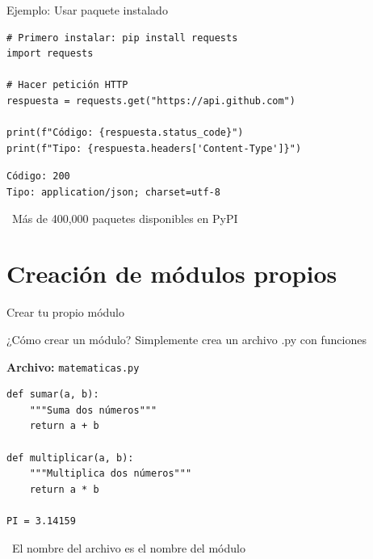 \documentclass{beamer}
\begin{document}
\begin{frame}[fragile]{Ejemplo: Usar paquete instalado \faRocket}
\begin{lstlisting}
# Primero instalar: pip install requests
import requests

# Hacer petición HTTP
respuesta = requests.get("https://api.github.com")

print(f"Código: {respuesta.status_code}")
print(f"Tipo: {respuesta.headers['Content-Type']}")
\end{lstlisting}

\vspace{-0.2cm}
\begin{tcolorbox}[colback=green!10,colframe=green,title={\small\faArrowCircleRight \ Salida},coltitle=fg0,left=3pt,right=3pt,top=2pt,bottom=2pt,boxsep=1pt]
\small\texttt{Código: 200\\
Tipo: application/json; charset=utf-8}
\end{tcolorbox}

\vspace{-0.1cm}
\begin{notebox}
\small\faInfoCircle\ Más de 400,000 paquetes disponibles en PyPI
\end{notebox}
\end{frame}

\section{Creación de módulos propios}

\begin{frame}[fragile]{Crear tu propio módulo \faWrench}
\begin{conceptbox}{¿Cómo crear un módulo?}
Simplemente crea un archivo .py con funciones
\end{conceptbox}

\textbf{Archivo:} \texttt{matematicas.py}
\begin{lstlisting}
def sumar(a, b):
    """Suma dos números"""
    return a + b

def multiplicar(a, b):
    """Multiplica dos números"""
    return a * b

PI = 3.14159
\end{lstlisting}

\vspace{-0.1cm}
\begin{notebox}
\small\faLightbulb\ El nombre del archivo es el nombre del módulo
\end{notebox}
\end{frame}
\end{document}
